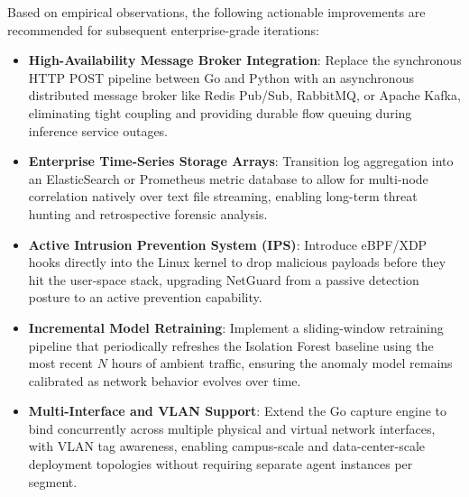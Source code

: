 \documentclass[conference]{IEEEtran}
\begin{document}
Based on empirical observations, the following actionable improvements are recommended for subsequent enterprise-grade iterations:
\begin{itemize}
    \item \textbf{High-Availability Message Broker Integration}: Replace the synchronous HTTP POST pipeline between Go and Python with an asynchronous distributed message broker like Redis Pub/Sub, RabbitMQ, or Apache Kafka, eliminating tight coupling and providing durable flow queuing during inference service outages.
    \item \textbf{Enterprise Time-Series Storage Arrays}: Transition log aggregation into an ElasticSearch or Prometheus metric database to allow for multi-node correlation natively over text file streaming, enabling long-term threat hunting and retrospective forensic analysis.
    \item \textbf{Active Intrusion Prevention System (IPS)}: Introduce eBPF/XDP hooks directly into the Linux kernel to drop malicious payloads before they hit the user-space stack, upgrading NetGuard from a passive detection posture to an active prevention capability.
    \item \textbf{Incremental Model Retraining}: Implement a sliding-window retraining pipeline that periodically refreshes the Isolation Forest baseline using the most recent $N$ hours of ambient traffic, ensuring the anomaly model remains calibrated as network behavior evolves over time.
    \item \textbf{Multi-Interface and VLAN Support}: Extend the Go capture engine to bind concurrently across multiple physical and virtual network interfaces, with VLAN tag awareness, enabling campus-scale and data-center-scale deployment topologies without requiring separate agent instances per segment.
\end{itemize}
\end{document}
